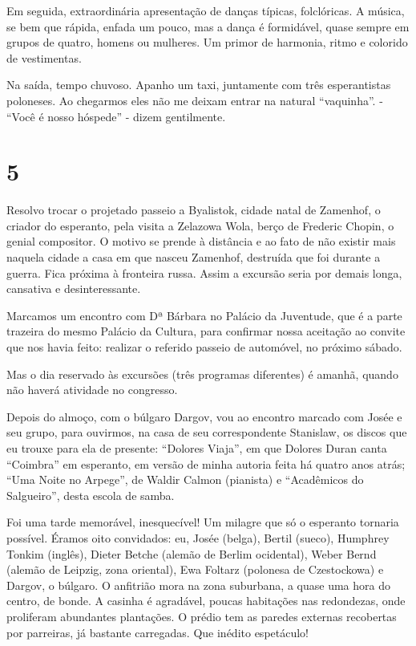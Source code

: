 Em seguida, extraordinária apresentação de danças típicas, folclóricas. A música, se bem que rápida, enfada um pouco, mas a dança é formidável, quase sempre em grupos de quatro, homens ou mulheres. Um primor de harmonia, ritmo e colorido de vestimentas.

Na saída, tempo chuvoso. Apanho um taxi, juntamente com três esperantistas poloneses. Ao chegarmos eles não me deixam entrar na natural “vaquinha”. - “Você é nosso hóspede” - dizem gentilmente.

\section*{5 \adfflatleafright {}}
Resolvo trocar o projetado passeio a Byalistok, cidade natal de Zamenhof, o criador do esperanto, pela visita a Zelazowa Wola, berço de Frederic Chopin, o genial compositor. O motivo se prende à distância e ao fato de não existir mais naquela cidade a casa em que nasceu Zamenhof, destruída que foi durante a guerra. Fica próxima à fronteira russa. Assim a excursão seria por demais longa, cansativa e desinteressante.

Marcamos um encontro com Dª Bárbara no Palácio da Juventude, que é a parte trazeira do mesmo Palácio da Cultura, para confirmar nossa aceitação ao convite que nos havia feito: realizar o referido passeio de automóvel, no próximo sábado.

Mas o dia reservado às excursões (três programas diferentes) é amanhã, quando não haverá atividade no congresso.

Depois do almoço, com o búlgaro Dargov, vou ao encontro marcado com Josée e seu grupo, para ouvirmos, na casa de seu correspondente Stanislaw, os discos que eu trouxe para ela de presente: “Dolores Viaja”, em que Dolores Duran canta “Coimbra” em esperanto, em versão de minha autoria feita há quatro anos atrás; “Uma Noite no Arpege”, de Waldir Calmon (pianista) e “Acadêmicos do Salgueiro”, desta escola de samba.

Foi uma tarde memorável, inesquecível! Um milagre que só o esperanto tornaria possível. Éramos oito convidados: eu, Josée (belga), Bertil (sueco), Humphrey Tonkim (inglês), Dieter Betche (alemão de Berlim ocidental), Weber Bernd (alemão de Leipzig, zona oriental), Ewa Foltarz (polonesa de Czestockowa) e Dargov, o búlgaro. O anfitrião mora na zona suburbana, a quase uma hora do centro, de bonde. A casinha é agradável, poucas habitações nas redondezas, onde proliferam abundantes plantações. O prédio tem as paredes externas recobertas por parreiras, já bastante carregadas. Que inédito espetáculo!

